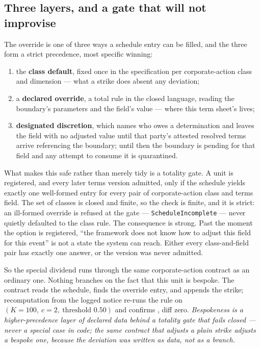 \subsection{Three layers, and a gate that will not improvise}

The override is one of three ways a schedule entry can be filled, and the three form a
strict precedence, most specific winning:

\begin{enumerate}[leftmargin=1.5em]
\item the \textbf{class default}, fixed once in the specification per corporate-action
class and dimension --- what a strike does absent any deviation;
\item a \textbf{declared override}, a total rule in the closed language, reading the
boundary's parameters and the field's value --- where this term sheet's 
lives;
\item \textbf{designated discretion}, which names who owes a determination and leaves
the field with no adjusted value until that party's attested resolved terms arrive
referencing the boundary; until then the boundary is pending for that field and any
attempt to consume it is quarantined.
\end{enumerate}

What makes this safe rather than merely tidy is a totality gate. A unit is registered,
and every later terms version admitted, only if the schedule yields exactly one
well-formed entry for every pair of corporate-action class and terms field. The set of
classes is closed and finite, so the check is finite, and it is strict: an ill-formed
override is refused at the gate --- \texttt{ScheduleIncomplete} --- never quietly
defaulted to the class rule. The consequence is strong. Past the moment the option is
registered, ``the framework does not know how to adjust this field for this event'' is
not a state the system can reach. Either every class-and-field pair has exactly one
answer, or the version was never admitted.

So the special dividend runs through the same corporate-action contract as an ordinary
one. Nothing branches on the fact that this unit is bespoke. The contract reads the
schedule, finds the override entry, and appends the  strike; recomputation
from the logged notice re-runs the rule on $(K = 100,\ c = 2,\ \text{threshold } 0.50)$
and confirms , diff zero. \emph{Bespokeness is a higher-precedence layer of
declared data behind a totality gate that fails closed --- never a special case in
code; the same contract that adjusts a plain strike adjusts a bespoke one, because the
deviation was written as data, not as a branch.}
